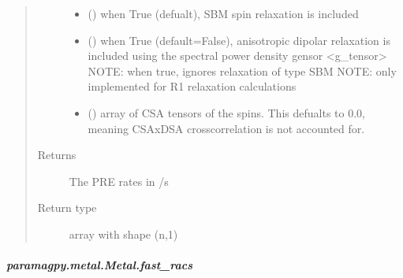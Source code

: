 \documentclass[a4paper,10pt,english,openany,oneside]{sphinxmanual}
\begin{document}
\begin{fulllineitems}
\begin{fulllineitems}
\begin{fulllineitems}
\begin{quote}
\begin{description}
\begin{itemize}
\item {} 
 (\sphinxstyleliteralemphasis{\sphinxupquote{ (}}\sphinxstyleliteralemphasis{\sphinxupquote{)}}) \textendash{} when True (defualt), SBM spin relaxation is included

\item {} 
 (\sphinxstyleliteralemphasis{\sphinxupquote{ (}}\sphinxstyleliteralemphasis{\sphinxupquote{)}}) \textendash{} when True (default=False), anisotropic dipolar relaxation is
included using the spectral power density gensor \textless{}g\_tensor\textgreater{}
NOTE: when true, ignores relaxation of type SBM
NOTE: only implemented for R1 relaxation calculations

\item {} 
 (\sphinxstyleliteralemphasis{\sphinxupquote{ (}}\sphinxstyleliteralemphasis{\sphinxupquote{,}}\sphinxstyleliteralemphasis{\sphinxupquote{,}}\sphinxstyleliteralemphasis{\sphinxupquote{) }}\sphinxstyleliteralemphasis{\sphinxupquote{(}}\sphinxstyleliteralemphasis{\sphinxupquote{)}}) \textendash{} array of CSA tensors of the spins.
This defualts to 0.0, meaning CSAxDSA crosscorrelation is
not accounted for.

\end{itemize}

\item[{Returns}] \leavevmode
{} \textendash{} The PRE rates in /s

\item[{Return type}] \leavevmode
array with shape (n,1)

\end{description}\end{quote}

\end{fulllineitems}



\subparagraph{paramagpy.metal.Metal.fast\_racs}
\label{\detokenize{reference/generated/paramagpy.metal.Metal.fast_racs:paramagpy-metal-metal-fast-racs}}\label{\detokenize{reference/generated/paramagpy.metal.Metal.fast_racs::doc}}


\end{fulllineitems}
\end{fulllineitems}
\end{document}
